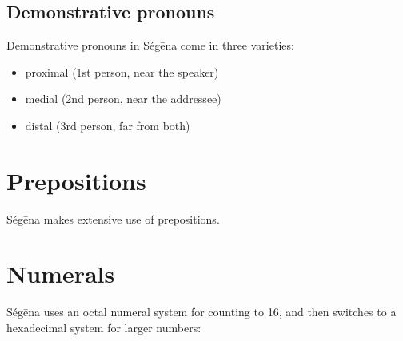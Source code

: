 \subsection{Demonstrative pronouns}

Demonstrative pronouns in Ségēna come in three varieties:

\begin{itemize}
	\item proximal (1st person, near the speaker)
	\item medial (2nd person, near the addressee)
	\item distal (3rd person, far from both)
\end{itemize}


\section{Prepositions}

Ségēna makes extensive use of prepositions.


\section{Numerals}

Ségēna uses an octal numeral system for counting to 16, and then switches to a
hexadecimal system for larger numbers:

